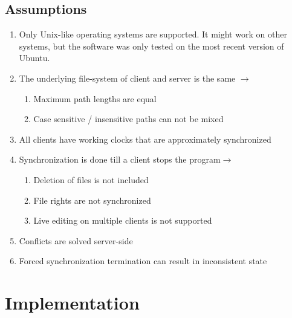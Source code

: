 \documentclass[a4paper]{article}
\begin{document}
\subsection{Assumptions}
\begin{enumerate}
\item Only Unix-like operating systems are supported. It might work on other systems, but the software was only tested on the most recent version of Ubuntu.
\item The underlying file-system of client and server is the same $\rightarrow$
\begin{enumerate}
	\item Maximum path lengths are equal
	\item Case sensitive / insensitive paths can not be mixed
\end{enumerate}
\item All clients have working clocks that are approximately synchronized
\item Synchronization is done till a client stops the program$\rightarrow$
\begin{enumerate}
	\item Deletion of files is not included
	\item File rights are not synchronized
	\item Live editing on multiple clients is not supported
\end{enumerate}
\item Conflicts are solved server-side
\item Forced synchronization termination can result in inconsistent state
\end{enumerate}


\section{Implementation}
\end{document}
